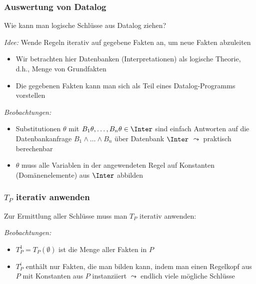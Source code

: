 \documentclass[aspectratio=1610,onlymath]{beamer}
\begin{document}
\begin{frame}\frametitle{Auswertung von Datalog}

\alert{Wie kann man logische Schlüsse aus Datalog ziehen?}\medskip

\emph{Idee:} Wende Regeln iterativ auf gegebene Fakten an, um neue Fakten abzuleiten

\begin{itemize}
\item Wir betrachten hier Datenbanken (Interpretationen) als logische Theorie, d.h., Menge von Grundfakten
\item Die gegebenen Fakten kann man sich als Teil eines Datalog-Programms vorstellen
\end{itemize}\medskip\pause

\pause

\emph{Beobachtungen:}
\begin{itemize}
\item Substitutionen $\theta$ mit $B_1\theta,\ldots,B_n\theta\in\Inter$ sind einfach Antworten auf die Datenbankanfrage $B_1\wedge\ldots\wedge B_n$ über Datenbank $\Inter$ \alert{$\leadsto$ praktisch berechenbar}
\item $\theta$ muss alle Variablen in der angewendeten Regel auf Konstanten (Domänenelemente) aus $\Inter$ abbilden
\end{itemize}

\end{frame}

\begin{frame}\frametitle{$T_P$ iterativ anwenden}

Zur Ermittlung aller Schlüsse muss man $T_P$ iterativ anwenden:\medskip

\medskip\pause

\emph{Beobachtungen:} 
\begin{itemize}
\item $T_P^1=T_P(\emptyset)$ ist die Menge aller Fakten in $P$
\item $T_P^i$ enthält nur Fakten, die man bilden kann, indem man einen Regelkopf aus $P$ mit Konstanten aus $P$ instanziiert $\leadsto$ endlich viele mögliche Schlüsse
\end{itemize}
\medskip\pause


\end{frame}
\end{document}
